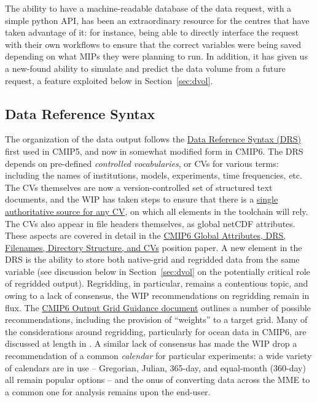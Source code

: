 \documentclass[gmd,manuscript]{copernicus}
\newcommand{\bibref}[1] { \cite{ref:#1}}
\newcommand{\secref}[1] {\mbox{Section  \ref{sec:#1}}}
\begin{document}
The ability to have a machine-readable database of the data request,
with a simple python API, has been an extraordinary resource for the
centres that have taken advantage of it: for instance, being able to
directly interface the request with their own workflows to ensure that
the correct variables were being saved depending on what MIPs they
were planning to run. In addition, it has given us a new-found ability
to simulate and predict the data volume from a future request, a
feature exploited below in \secref{dvol}.

\subsection{Data Reference Syntax}
\label{sec:data-drs}

The organization of the data output follows the \href{http://goo.gl/v1drZl}{Data 
Reference Syntax (DRS)} first used in CMIP5, and now in somewhat 
modified form in CMIP6. The DRS depends on pre-defined 
\emph{controlled vocabularies}, or CVs for various terms: including 
the names of institutions, models, experiments, time frequencies, etc. 
The CVs themselves are now a version-controlled set of structured text 
documents, and the WIP has taken steps to ensure that there is a
\href{https://goo.gl/HGafnJ}{single authoritative source for any CV},
on which all elements in the toolchain will rely. The CVs also appear
in file headers themselves, as global netCDF attributes. These aspects
are covered in detail in the \href{https://goo.gl/cMiPE7}{CMIP6 Global 
Attributes, DRS, Filenames, Directory Structure, and CVs} position
paper. A new element in the DRS is the ability to store both
native-grid and regridded data from the same variable (see discussion
below in \secref{dvol} on the potentially critical role of regridded
output). Regridding, in particular, remains a contentious topic, and
owing to a lack of consensus, the WIP recommendations on regridding
remain in flux. The \href{https://goo.gl/wVtm5t}{CMIP6 Output Grid 
Guidance document} outlines a number of possible recommendations,
including the provision of ``weights'' to a target grid. Many of the
considerations around regridding, particularly for ocean data in
CMIP6, are discussed at length in \bibref{griffiesetal2016}. A similar
lack of consensus has made the WIP drop a recommendation of a common
\emph{calendar} for particular experiments: a wide variety of
calendars are in use -- Gregorian, Julian, 365-day, and equal-month
(360-day) all remain popular options -- and the onus of converting
data across the MME to a common one for analysis remains upon the
end-user.
\end{document}
